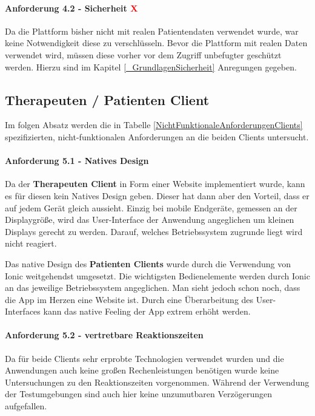 \paragraph{Anforderung 4.2 - Sicherheit  \textcolor{red}{X}} Da die Plattform bisher nicht mit realen Patientendaten verwendet wurde, war keine Notwendigkeit diese zu verschlüsseln. Bevor die Plattform mit realen Daten verwendet wird, müssen diese vorher vor dem Zugriff unbefugter geschützt werden. Hierzu sind im Kapitel \ref{_GrundlagenSicherheit} Anregungen gegeben.

\subsection{Therapeuten / Patienten Client}
Im folgen Absatz werden die in Tabelle \ref{NichtFunktionaleAnforderungenClients} spezifizierten, nicht-funktionalen Anforderungen an die beiden Clients untersucht.
\paragraph{Anforderung 5.1 - Natives Design \textcolor{green}{\checkmark}} Da der \textbf{Therapeuten Client} in Form einer Website implementiert wurde, kann es für diesen kein Natives Design geben. Dieser hat dann aber den Vorteil, dass er auf jedem Gerät gleich aussieht. Einzig bei mobile Endgeräte, gemessen an der Displaygröße, wird das User-Interface der Anwendung angeglichen um kleinen Displays gerecht zu werden. Darauf, welches Betriebssystem zugrunde liegt wird nicht reagiert.

Das native Design des \textbf{Patienten Clients} wurde durch die Verwendung von Ionic weitgehendst umgesetzt. Die wichtigsten Bedienelemente werden durch Ionic an das jeweilige Betriebssystem angeglichen. Man sieht jedoch schon noch, dass die App im Herzen eine Website ist. Durch eine Überarbeitung des User-Interfaces kann das native Feeling der App extrem erhöht werden.

\paragraph{Anforderung 5.2 - vertretbare Reaktionszeiten \textcolor{green}{\checkmark}} Da für beide Clients sehr erprobte Technologien verwendet wurden und die Anwendungen auch keine großen Rechenleistungen benötigen wurde keine Untersuchungen zu den Reaktionszeiten vorgenommen. Während der Verwendung der Testumgebungen sind auch hier keine unzumutbaren Verzögerungen aufgefallen.

